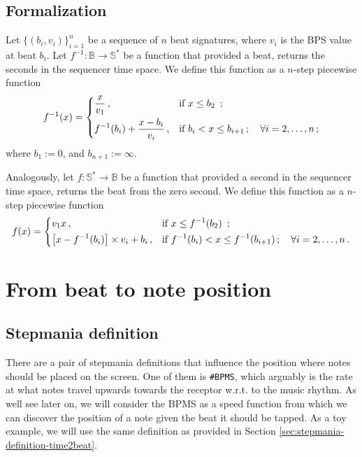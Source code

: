\documentclass[a4paper,9pt]{article}
\begin{document}
\subsection{Formalization}
Let $\{\left( b_i, v_i \right)\}_{i=1}^{n}$ be a sequence of $n$ beat signatures, where $v_i$ is the BPS  value at beat $b_i$. 
Let $ f^{-1}: \mathbb{B} \rightarrow \mathbb{S^{*}} $ be a function that provided a beat, returns the seconds in the sequencer time space. We define this function as a $n$-step piecewise function
    \begin{equation}
	    f^{-1}(x) = \begin{dcases}
		    \frac{x}{v_1}\,, & \text{if $x \leq b_{2} $ }\,;\\
		    f^{-1}(b_{i}) + \frac{x-b_{i}}{v_i}\,, & \text{if $b_{i} < x \leq b_{i+1}\,; \quad \forall i=2,\ldots,n $}\,; \\
	    \end{dcases}
	    \label{eq:beat2second}
    \end{equation}
    where $ b_1 := 0$,  and $b_{n+1} := \infty$.
    
    Analogously, let $ f: \mathbb{S^{*}} \rightarrow \mathbb{B} $ be a function that provided a second in the sequencer time space, returns the beat from the zero second. We define this function as a $n$-step piecewise function
    \begin{equation}
	    f(x) = \begin{dcases}
		    v_1x\,, & \text{if $x \leq f^{-1}(b_{2}) $ }\,;\\
		    \left[x-f^{-1}(b_{i})\right]\times v_i + b_{i}\,, & \text{if $f^{-1}(b_{i}) < x \leq f^{-1}(b_{i+1})\,;\quad \forall i=2,\ldots,n$}\,. \\
	    \end{dcases}
	    \label{eq:beat2second}
    \end{equation}

    \section{From beat to note position}

    \subsection{Stepmania definition}

    There are a pair of stepmania definitions that influence the position where notes should be placed on the screen. One of them is \texttt{\#BPMS}, which arguably is the rate at what notes travel upwards towards the receptor w.r.t. to the music rhythm. As well see later on, we will consider the BPMS as a speed function from which we can discover the position of a note given the beat it should be tapped. As a toy example, we will use the same definition as provided in Section \ref{sec:stepmania-definition-time2beat}. 
\end{document}
